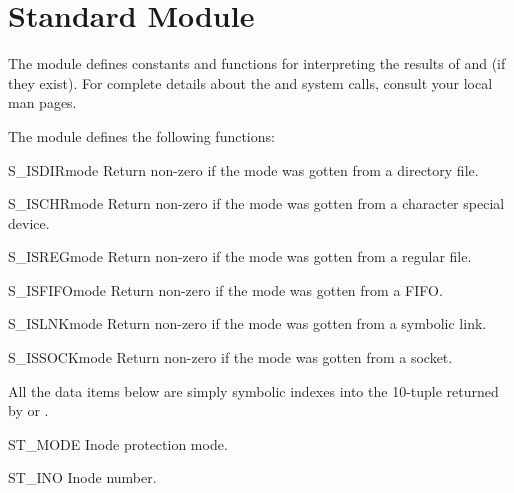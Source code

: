 
\section{Standard Module }
\label{module-stat}

The  module defines constants and functions for interpreting the
results of  and  (if they exist).
For complete details about the  and  system
calls, consult your local man pages.

The  module defines the following functions:

\renewcommand{\indexsubitem}{(in module stat)}

\begin{funcdesc}{S_ISDIR}{mode}
Return non-zero if the mode was gotten from a directory file.
\end{funcdesc}

\begin{funcdesc}{S_ISCHR}{mode}
Return non-zero if the mode was gotten from a character special device.
\end{funcdesc}

\begin{funcdesc}{S_ISREG}{mode}
Return non-zero if the mode was gotten from a regular file.
\end{funcdesc}

\begin{funcdesc}{S_ISFIFO}{mode}
Return non-zero if the mode was gotten from a FIFO.
\end{funcdesc}

\begin{funcdesc}{S_ISLNK}{mode}
Return non-zero if the mode was gotten from a symbolic link.
\end{funcdesc}

\begin{funcdesc}{S_ISSOCK}{mode}
Return non-zero if the mode was gotten from a socket.
\end{funcdesc}

All the data items below are simply symbolic indexes into the 10-tuple
returned by  or .  

\begin{datadesc}{ST_MODE}
Inode protection mode.
\end{datadesc}

\begin{datadesc}{ST_INO}
Inode number.
\end{datadesc}


